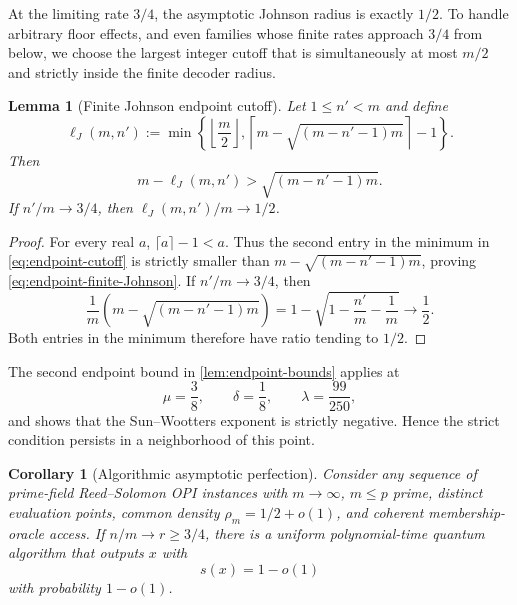 \documentclass[11pt,letterpaper]{article}
\newtheorem{lemma}[theorem]{Lemma}
\newtheorem{corollary}[theorem]{Corollary}
\theoremstyle{definition}
\begin{document}
At the limiting rate $3/4$, the asymptotic Johnson radius is exactly $1/2$.  To handle arbitrary floor effects, and even families whose finite rates approach $3/4$ from below, we choose the largest integer cutoff that is simultaneously at most $m/2$ and strictly inside the finite decoder radius.

\begin{lemma}[Finite Johnson endpoint cutoff]
\label{lem:three-quarter-slack}
Let $1\le n'<m$ and define
\begin{equation}
   \ell_J(m,n'):=
   \min\left\{
      \left\lfloor\frac m2\right\rfloor,
      \left\lceil m-\sqrt{(m-n'-1)m}\right\rceil-1
   \right\}.
   \label{eq:endpoint-cutoff}
\end{equation}
Then
\begin{equation}
   m-\ell_J(m,n')>\sqrt{(m-n'-1)m}.
   \label{eq:endpoint-finite-Johnson}
\end{equation}
If $n'/m\to3/4$, then $\ell_J(m,n')/m\to1/2$.
\end{lemma}

\begin{proof}
For every real $a$, $\lceil a\rceil-1<a$.  Thus the second entry in the minimum in \cref{eq:endpoint-cutoff} is strictly smaller than
$m-\sqrt{(m-n'-1)m}$, proving \cref{eq:endpoint-finite-Johnson}.  If $n'/m\to3/4$, then
\[
   \frac1m\left(m-\sqrt{(m-n'-1)m}\right)
   =1-\sqrt{1-\frac{n'}m-\frac1m}\longrightarrow\frac12.
\]
Both entries in the minimum therefore have ratio tending to $1/2$.
\end{proof}

The second endpoint bound in \cref{lem:endpoint-bounds} applies at
\begin{equation}
   \mu=\frac38,
   \qquad \delta=\frac18,
   \qquad \lambda=\frac{99}{250},
   \label{eq:three-quarter-point}
\end{equation}
and shows that the Sun--Wootters exponent is strictly negative.  Hence the
strict condition persists in a neighborhood of this point.

\begin{corollary}[Algorithmic asymptotic perfection]
\label{cor:perfect-three-quarter}
Consider any sequence of prime-field Reed--Solomon OPI instances with $m\to\infty$, $m\le p$ prime, distinct evaluation points, common density $\rho_m=1/2+o(1)$, and coherent membership-oracle access.  If $n/m\to r\ge3/4$, there is a uniform polynomial-time quantum algorithm that outputs $x$ with
\begin{equation}
   s(x)=1-o(1)
\end{equation}
with probability $1-o(1)$.
\end{corollary}
\end{document}
